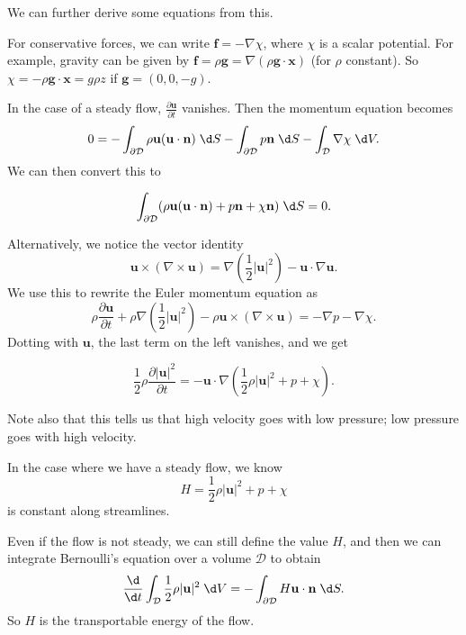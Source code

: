 \documentclass[a4paper]{article}
\begin{document}
We can further derive some equations from this.

For conservative forces, we can write $\mathbf{f} = -\nabla \chi$, where $\chi$ is a scalar potential. For example, gravity can be given by $\mathbf{f} = \rho \mathbf{g} = \nabla (\rho \mathbf{g}\cdot \mathbf{x})$ (for $\rho$ constant). So $\chi = - \rho \mathbf{g}\cdot \mathbf{x} = g \rho z$ if $\mathbf{g} = (0, 0, -g)$.

In the case of a steady flow, $\frac{\partial \mathbf{u}}{\partial t}$ vanishes. Then the momentum equation becomes
\[
  0 = -\int_{\partial \mathcal{D}} \rho \mathbf{u} (\mathbf{u} \cdot \mathbf{n}) \;\d S - \int_{\partial \mathcal{D}}p \mathbf{n} \;\d S - \int_{\mathcal{D}} \nabla \chi \;\d V.
\]
We can then convert this to
\begin{prop}
  \[
    \int_{\partial \mathcal{D}} (\rho \mathbf{u} (\mathbf{u}\cdot \mathbf{n}) + p \mathbf{n} + \chi \mathbf{n}) \;\d S = 0.
  \]
\end{prop}
Alternatively, we notice the vector identity
\[
  \mathbf{u}\times (\nabla \times \mathbf{u}) = \nabla\left(\frac{1}{2}|\mathbf{u}|^2\right) - \mathbf{u}\cdot \nabla \mathbf{u}.
\]
We use this to rewrite the Euler momentum equation as
\[
  \rho \frac{\partial \mathbf{u}}{\partial t} + \rho \nabla \left(\frac{1}{2}|\mathbf{u}|^2\right) - \rho \mathbf{u}\times (\nabla \times \mathbf{u}) = -\nabla p - \nabla \chi.
\]
Dotting with $\mathbf{u}$, the last term on the left vanishes, and we get
\begin{prop}
  \[
    \frac{1}{2}\rho \frac{\partial|\mathbf{u}|^2}{\partial t} = -\mathbf{u}\cdot \nabla \left(\frac{1}{2} \rho |\mathbf{u}|^2 + p + \chi\right).
  \]
\end{prop}
Note also that this tells us that high velocity goes with low pressure; low pressure goes with high velocity.

In the case where we have a steady flow, we know
\[
  H = \frac{1}{2}\rho |\mathbf{u}|^2 + p + \chi
\]
is constant along streamlines.

Even if the flow is not steady, we can still define the value $H$, and then we can integrate Bernoulli's equation over a volume $\mathcal{D}$ to obtain
\[
  \frac{\d}{\d t}\int_{\mathcal{D}} \frac{1}{2}\rho |\mathbf{u}|^2 \;\d V = -\int_{\partial \mathcal{D}} H \mathbf{u}\cdot \mathbf{n} \;\d S.
\]
So $H$ is the transportable energy of the flow.
\end{document}
